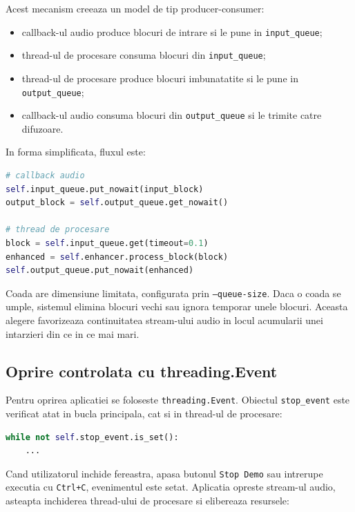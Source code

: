 \documentclass[12pt,a4paper]{article}
\begin{document}
Acest mecanism creeaza un model de tip producer-consumer:

\begin{itemize}
    \item callback-ul audio produce blocuri de intrare si le pune in
    \texttt{input\_queue};
    \item thread-ul de procesare consuma blocuri din \texttt{input\_queue};
    \item thread-ul de procesare produce blocuri imbunatatite si le pune in
    \texttt{output\_queue};
    \item callback-ul audio consuma blocuri din \texttt{output\_queue} si le
    trimite catre difuzoare.
\end{itemize}

In forma simplificata, fluxul este:

\begin{lstlisting}[language=Python]
# callback audio
self.input_queue.put_nowait(input_block)
output_block = self.output_queue.get_nowait()

# thread de procesare
block = self.input_queue.get(timeout=0.1)
enhanced = self.enhancer.process_block(block)
self.output_queue.put_nowait(enhanced)
\end{lstlisting}

Coada are dimensiune limitata, configurata prin \texttt{--queue-size}. Daca o
coada se umple, sistemul elimina blocuri vechi sau ignora temporar unele blocuri.
Aceasta alegere favorizeaza continuitatea stream-ului audio in locul acumularii
unei intarzieri din ce in ce mai mari.

\subsection{Oprire controlata cu threading.Event}

Pentru oprirea aplicatiei se foloseste \texttt{threading.Event}. Obiectul
\texttt{stop\_event} este verificat atat in bucla principala, cat si in thread-ul
de procesare:

\begin{lstlisting}[language=Python]
while not self.stop_event.is_set():
    ...
\end{lstlisting}

Cand utilizatorul inchide fereastra, apasa butonul \texttt{Stop Demo} sau
intrerupe executia cu \texttt{Ctrl+C}, evenimentul este setat. Aplicatia opreste
stream-ul audio, asteapta inchiderea thread-ului de procesare si elibereaza
resursele:
\end{document}
